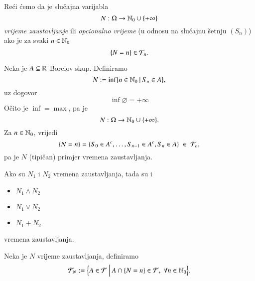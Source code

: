 \begin{defn}    \label{defn:15.2-1}
    Re\' ci \' cemo da je slu\v cajna varijabla
    \begin{equation*}
        N : \Omega \to  \mathbb{N}_0 \cup \{ +\infty \}
    \end{equation*}
    \emph{vrijeme zaustavljanje} ili \emph{opcionalno vrijeme} (u odnosu na slu\v cajnu \v setnju $(S_n)$) ako je za svaki $n \in \mathbb{N}_0$
    \begin{equation*}
        \{ N = n \} \in \mathcal{F}_n.
    \end{equation*}
\end{defn}

\begin{pr}  \label{pr:15.3}
    Neka je $A \subseteq \mathbb{R}$ Borelov skup.
    Definiramo
    \begin{equation*}
        N := \inf \{{n \in \mathbb{N}_0} \: | \: {S_n \in A}\},
    \end{equation*}
    uz dogovor
    \begin{equation*}
        \inf \varnothing = +\infty
    \end{equation*}
    O\v cito je $\inf = \max$, pa je
    \begin{equation*}
        N: \Omega \to \mathbb{N}_0 \cup \{+\infty\}.
    \end{equation*}
    Za $n \in \mathbb{N}_0$, vrijedi
    \begin{equation*}
        \{ N = n \} = \{ S_0 \in A^c, \ldots, S_{n - 1} \in A^c, S_n \in A \} \; \in \; \mathcal{F}_n,
    \end{equation*}
    pa je $N$ (tipi\v can) primjer vremena zaustavljanja.
\end{pr}

\begin{zad} \label{zad:15.4}
    Ako su $N_1$ i $N_2$ vremena zaustavljanja, tada su i
    \begin{itemize}
        \item[] $N_1 \land N_2$
        \item[] $N_1 \lor N_2$
        \item[] $N_1 + N_2$  
    \end{itemize}
    vremena zaustavljanja.
\end{zad}

\begin{defn}    \label{defn:15.4-1}
    Neka je $N$ vrijeme zaustavljanja, definiramo
    \begin{equation}    \label{jed:15.5}
        \mathcal{F}_N := \Big\{{A \in \mathcal{F}} \: \Big| \: {A \cap \{N = n\} \in \mathcal{F}, \; \forall n \in \mathbb{N}_0 }\Big\}.
    \end{equation}
\end{defn}

